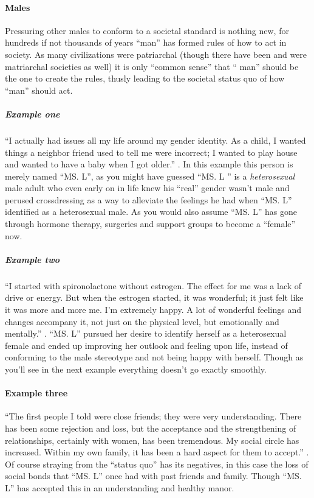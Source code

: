 \paragraph{Males}
Pressuring other males to conform to a societal standard is
nothing new, for hundreds if not thousands of years ``man'' has formed rules of
how to act in society. As many civilizations were patriarchal (though there have
been and were matriarchal societies as well) it is only ``common sense'' that ``
man'' should be the one to create the rules, thusly leading to the societal
status quo of how ``man'' should act.
\par

\subparagraph{Example one}
``I actually had issues all my life around my gender identity. As a child, I
wanted things a neighbor friend used to tell me were incorrect; I wanted to play
house and wanted to have a baby when I got older.'' \cite[p.~478]{MOT} . In this
example this person is merely named ``MS. L'', as you might have guessed ``MS. L
'' is a \textit{heterosexual} male adult who even early on in life knew his
``real'' gender wasn't male and perused crossdressing as a way to alleviate the
feelings he had when ``MS. L'' identified as a heterosexual male. As you would
also assume ``MS. L'' has gone through hormone therapy, surgeries and support
groups to become a ``female'' now.
\par

\subparagraph{Example two}
``I started with spironolactone without estrogen. The effect for me was a lack
of drive or energy. But when the estrogen started, it was wonderful; it just
felt like it was more and more me. I’m extremely happy. A lot of wonderful
feelings and changes accompany it, not just on the physical level, but
emotionally and mentally.'' \cite[p.~479]{MOT} . ``MS. L'' pursued her desire to
identify herself as a heterosexual female and ended up improving her outlook and
feeling upon life, instead of conforming to the male stereotype and not being
happy with herself. Though as you'll see in the next example everything doesn't
go exactly smoothly.
\par

\paragraph{Example three}
``The first people I told were close friends; they were very understanding.
There has been some rejection and loss, but the acceptance and the strengthening
of relationships, certainly with women, has been tremendous. My social circle
has increased. Within my own family, it has been a hard aspect for them to
accept.'' \cite[p.~478-479]{MOT} . Of course straying from the ``status quo''
has its negatives, in this case the loss of social bonds that ``MS. L'' once had
with past friends and family. Though ``MS. L'' has accepted this in an
understanding and healthy manor.
\par

